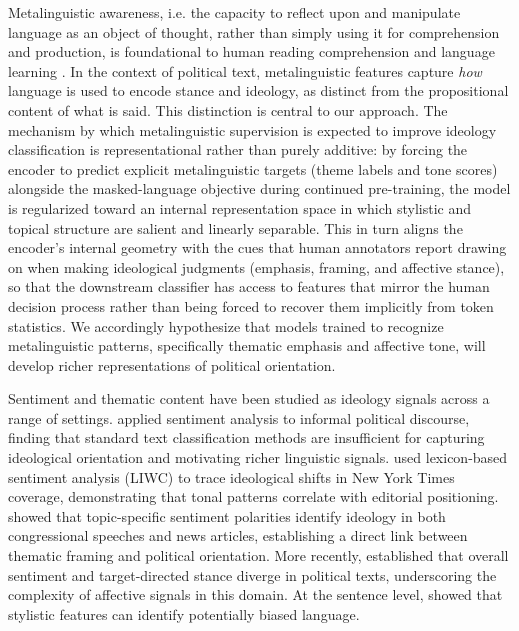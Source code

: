 Metalinguistic awareness, i.e. the capacity to reflect upon and manipulate language as an object of thought, rather than simply using it for comprehension and production, is foundational to human reading comprehension and language learning \citep{tunmer1984development, nagy2007metalinguistic, Zipke10092007}. In the context of political text, metalinguistic features capture \textit{how} language is used to encode stance and ideology, as distinct from the propositional content of what is said. This distinction is central to our approach. The mechanism by which metalinguistic supervision is expected to improve ideology classification is representational rather than purely additive: by forcing the encoder to predict explicit metalinguistic targets (theme labels and tone scores) alongside the masked-language objective during continued pre-training, the model is regularized toward an internal representation space in which stylistic and topical structure are salient and linearly separable. This in turn aligns the encoder's internal geometry with the cues that human annotators report drawing on when making ideological judgments (emphasis, framing, and affective stance), so that the downstream classifier has access to features that mirror the human decision process rather than being forced to recover them implicitly from token statistics. We accordingly hypothesize that models trained to recognize metalinguistic patterns, specifically thematic emphasis and affective tone, will develop richer representations of political orientation.

Sentiment and thematic content have been studied as ideology signals across a range of settings. \citet{mullen2006preliminary} applied sentiment analysis to informal political discourse, finding that standard text classification methods are insufficient for capturing ideological orientation and motivating richer linguistic signals. \citet{smirnova2017ideology} used lexicon-based sentiment analysis (LIWC) to trace ideological shifts in New York Times coverage, demonstrating that tonal patterns correlate with editorial positioning. \citet{bhatia2018topic} showed that topic-specific sentiment polarities identify ideology in both congressional speeches and news articles, establishing a direct link between thematic framing and political orientation. More recently, \citet{bestvater2023sentiment} established that overall sentiment and target-directed stance diverge in political texts, underscoring the complexity of affective signals in this domain. At the sentence level, \citet{recasens2013weasel} showed that stylistic features can identify potentially biased language.

